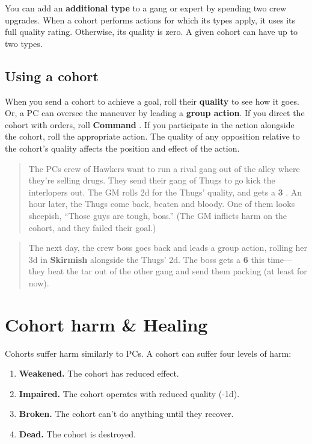 \documentclass[11pt,fleqn,a5paper]{book}
\newcommand{\gameterm}[1]{\textbf{#1}}
\begin{document}
You can add an \textbf{additional type} to a gang or expert by spending two crew upgrades. When a cohort performs actions for which its types apply, it uses its full quality rating. Otherwise, its quality is zero. A given cohort can have up to two types.

\subsection{Using a cohort}

When you send a cohort to achieve a goal, roll their \textbf{quality} to see how it goes. Or, a PC can oversee the maneuver by leading a \textbf{group action}. If you direct the cohort with orders, roll \gameterm{Command} . If you participate in the action alongside the cohort, roll the appropriate action. The quality of any opposition relative to the cohort’s quality affects the position and effect of the action.

\begin{quote}
	The PCs crew of Hawkers want to run a rival gang out of the alley where they’re selling drugs. They send their gang of Thugs to go kick the interlopers out. The GM rolls 2d for the Thugs’ quality, and gets a \gameterm{3} . An hour later, the Thugs come back, beaten and bloody. One of them looks sheepish, “Those guys are tough, boss.” (The GM inflicts harm on the cohort, and they failed their goal.)
\end{quote} 

\begin{quote}
	The next day, the crew boss goes back and leads a group action, rolling her 3d in \gameterm{Skirmish}  alongside the Thugs’ 2d. The boss gets a \gameterm{6}  this time---they beat the tar out of the other gang and send them packing (at least for now).
\end{quote} 

\section{Cohort harm \& Healing}

Cohorts suffer harm similarly to PCs. A cohort can suffer four levels of harm:
\begin{enumerate}
	\item \textbf{Weakened.} The cohort has reduced effect.
	\item \textbf{Impaired.} The cohort operates with reduced quality (-1d).
	\item \textbf{Broken.} The cohort can’t do anything until they recover.
	\item \textbf{Dead.} The cohort is destroyed.
\end{enumerate}
\end{document}
